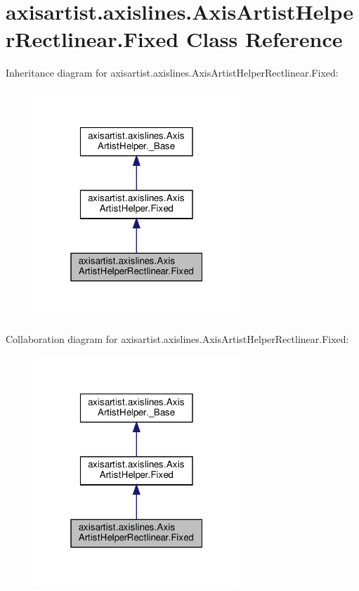 \hypertarget{classaxisartist_1_1axislines_1_1AxisArtistHelperRectlinear_1_1Fixed}{}\section{axisartist.\+axislines.\+Axis\+Artist\+Helper\+Rectlinear.\+Fixed Class Reference}
\label{classaxisartist_1_1axislines_1_1AxisArtistHelperRectlinear_1_1Fixed}


Inheritance diagram for axisartist.\+axislines.\+Axis\+Artist\+Helper\+Rectlinear.\+Fixed\+:
\nopagebreak
\begin{figure}[H]
\begin{center}
\leavevmode
\includegraphics[width=220pt]{classaxisartist_1_1axislines_1_1AxisArtistHelperRectlinear_1_1Fixed__inherit__graph}
\end{center}
\end{figure}


Collaboration diagram for axisartist.\+axislines.\+Axis\+Artist\+Helper\+Rectlinear.\+Fixed\+:
\nopagebreak
\begin{figure}[H]
\begin{center}
\leavevmode
\includegraphics[width=220pt]{classaxisartist_1_1axislines_1_1AxisArtistHelperRectlinear_1_1Fixed__coll__graph}
\end{center}
\end{figure}
